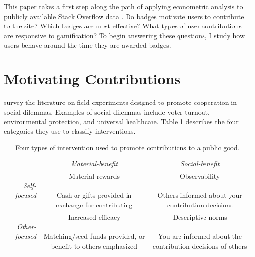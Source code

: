 \documentclass[conference]{IEEEtran}
\newcommand{\1}{\mathds{1}}
\newcommand{\myrotate}[1]{#1}
\newcommand{\PreserveBackslash}[1]{\let\temp=\\#1\let\\=\temp}
\newcommand{\mycell}[1]{\parbox[m]{1.1in}{\PreserveBackslash\raggedright \vspace{7pt} #1 \vspace{7pt}}}
\begin{document}
This paper takes a first step along the path of applying econometric analysis to publicly available Stack Overflow data \cite{se-dump}. Do badges motivate users to contribute to the site? Which badges are most effective? What types of user contributions are responsive to gamification? To begin answering these questions, I study how users behave around the time they are awarded badges.

\section{Motivating Contributions}

\citet{Kraft-Todd} survey the literature on field experiments designed
to promote cooperation in social dilemmas. Examples of social dilemmas include voter turnout,
environmental protection, and universal healthcare. Table
\ref{tab:kraft-todd} describes the four categories they use to
classify interventions.

\begin{table}[h!tbp]
  \renewcommand{\arraystretch}{2}
  \caption{Four types of intervention used to promote contributions to a public good.}
  \label{tab:kraft-todd}
  \begin{tabular}{r|c|c|}

    \multicolumn{1}{c}{} & \multicolumn{1}{c}{\textit{Material-benefit}} & \multicolumn{1}{c}{\textit{Social-benefit}} \\
    \cline{2-3}

    \myrotate{\textit{Self-focused}} & \mycell{ Material rewards \\ \\ Cash or gifts provided in exchange for contributing } & \mycell{Observability \\ \\ Others informed about your contribution decisions} \\


    \myrotate{\textit{Other-focused}} & \mycell{ Increased efficacy \\ \\ Matching/seed funds provided, or benefit to others emphasized } & \mycell{Descriptive norms \\ \\ You are informed about the contribution decisions of others} \\

  \end{tabular}
\end{table}
\end{document}
